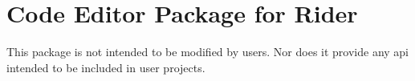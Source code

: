 \chapter{Code Editor Package for Rider}
\hypertarget{md__library_2_package_cache_2com_8unity_8ide_8rider_0d3_80_828_2_documentation_0i_2_r_e_a_d_m_e}{}\label{md__library_2_package_cache_2com_8unity_8ide_8rider_0d3_80_828_2_documentation_0i_2_r_e_a_d_m_e}
\label{md__library_2_package_cache_2com_8unity_8ide_8rider_0d3_80_828_2_documentation_0i_2_r_e_a_d_m_e_autotoc_md266}%
%
 This package is not intended to be modified by users. Nor does it provide any api intended to be included in user projects. 